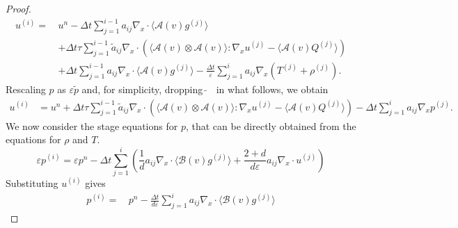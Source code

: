 \documentclass[10pt,a4paper]{amsart}
\begin{document}
\begin{proof}
\begin{equation}
\begin{split}
u^{(i)} = \, & u^n - \Delta t  \sum_{j = 1}^{i-1} a_{ij} \nabla_x \cdot \langle \mathcal{A}(v) g^{(j)} \rangle \\
& + \Delta t \tau  \sum_{j=1}^{i-1} \tilde{a}_{ij} \nabla_x \cdot \left( \langle \mathcal{A}(v) \otimes \mathcal{A}(v) \rangle : \nabla_x u^{(j)} - \langle \mathcal{A}(v) Q^{(j)} \rangle \right) \\
& + \Delta t  \sum_{j = 1}^{i-1} a_{ij} \nabla_x \cdot \langle \mathcal{A}(v) g^{(j)} \rangle - \frac{\Delta t}{\varepsilon} \sum_{j = 1}^i a_{ij} \nabla_x (T^{(j)} + \rho^{(j)}).
\end{split}
\end{equation}
Rescaling $p$ as  $\varepsilon \tilde p $ and, for simplicity, dropping  $\widetilde{~}$ ~in what follows, we obtain
\begin{equation}
\begin{split} \label{InternalStagesforu}
u^{(i)} &= u^n 
+ \Delta t \tau  \sum_{j=1}^{i-1} \tilde{a}_{ij}  \nabla_x \cdot \left( \langle \mathcal{A}(v) \otimes  \mathcal{A}(v) \rangle : \nabla_x u^{(j)} - \langle \mathcal{A}(v) Q^{(j)} \rangle\right) 
- \Delta t  \sum_{j = 1}^i  a_{ij} \nabla_x p^{(j)}.
\end{split}
\end{equation}
We now consider the stage equations for $p$, that can be directly obtained from the equations for $\rho$ and $T$.
\begin{equation}
\varepsilon p^{(i)} = \varepsilon p^n  - \Delta t  \sum_{j = 1}^i \left( \frac{1}{d} a_{ij} \nabla_x \cdot \langle \mathcal{B}(v) g^{(j)} \rangle  + \frac{2+d}{d \varepsilon} a_{ij} \nabla_x \cdot u^{(j)}\right) 
\end{equation}
Substituting $u^{(i)}$ gives
\begin{equation}
\label{eq:pressure_stage}
\begin{split}
p^{(i)} = \, & p^n - \frac{\Delta t}{d \varepsilon} \sum_{j = 1}^i a_{ij} \nabla_x \cdot \langle \mathcal{B}(v) g^{(j)} \rangle 

\end{split}
\end{equation}
\end{proof}
\end{document}
